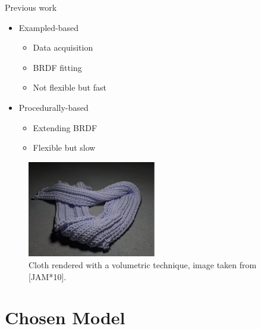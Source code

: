 \documentclass{beamer}
\begin{document}
\begin{frame}{Previous work}

\begin{multicols}{2}

\begin{itemize}
\setlength\itemsep{0.5em}
\item Exampled-based
		\begin{itemize}
		\setlength\itemsep{0.5em}
		\item Data acquisition
		\item BRDF fitting
		\item Not flexible but fast
		\end{itemize}
\item Procedurally-based
		\begin{itemize}
		\setlength\itemsep{0.5em}
		\item Extending BRDF
		\item Flexible but slow
		\end{itemize}
\end{itemize}

\begin{figure}[t!]
\begin{center}
\includegraphics[width=0.5\textwidth]{img/volumetricCloth} 
\caption*{\tiny{Cloth rendered with a volumetric technique, image taken from [JAM*10].}}
\end{center}
\end{figure}
\end{multicols}



\end{frame}

\section{Chosen Model}
\end{document}
